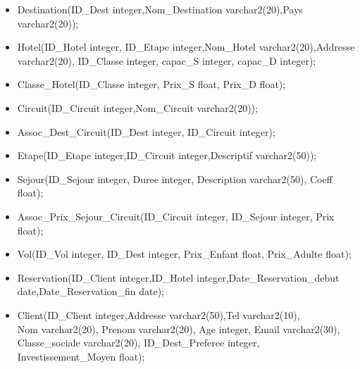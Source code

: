 \begin{itemize}
\item Destination(ID\_Dest integer,Nom\_Destination varchar2(20),Pays varchar2(20));\\
\item Hotel(ID\_Hotel integer, ID\_Etape integer,Nom\_Hotel varchar2(20),Addresse varchar2(20), ID\_Classe integer, capac\_S integer, capac\_D integer);\\
\item Classe\_Hotel(ID\_Classe integer, Prix\_S float, Prix\_D float);\\
\item Circuit(ID\_Circuit integer,Nom\_Circuit varchar2(20));\\
\item Assoc\_Dest\_Circuit(ID\_Dest integer, ID\_Circuit integer);\\
\item Etape(ID\_Etape integer,ID\_Circuit integer,Descriptif varchar2(50));\\
\item Sejour(ID\_Sejour integer, Duree integer, Description varchar2(50), Coeff float);\\
\item Assoc\_Prix\_Sejour\_Circuit(ID\_Circuit integer, ID\_Sejour integer, Prix float);\\
\item Vol(ID\_Vol integer, ID\_Dest integer, Prix\_Enfant float, Prix\_Adulte float);\\
\item Reservation(ID\_Client integer,ID\_Hotel integer,Date\_Reservation\_debut date,Date\_Reservation\_fin date);\\ 
\item Client(ID\_Client integer,Addresse varchar2(50),Tel varchar2(10), \\
		Nom varchar2(20), Prenom varchar2(20), Age integer, Email varchar2(30),\\
		Classe\_sociale varchar2(20), ID\_Dest\_Preferee integer, Investissement\_Moyen float);\\


\end{itemize}
